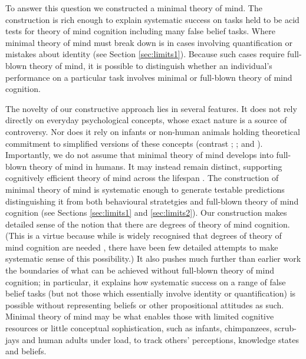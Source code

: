 \documentclass[12pt,\papersize]{extarticle}
\begin{document}
To answer this question we constructed a minimal theory of mind.  The construction is  rich enough to explain systematic success on tasks held to be acid tests for theory of mind cognition including many false belief tasks.  
Where minimal theory of mind must break down is in cases involving quantification or mistakes about identity (see Section \ref{sec:limits1}).  
Because such cases require full-blown theory of mind, it is possible to distinguish whether an individual’s performance on a particular task involves minimal or full-blown theory of mind cognition. 

The novelty of our constructive approach lies in several features.  It does not rely directly on everyday psychological concepts, whose exact nature is a source of controversy.
Nor does it rely on infants or non-human animals holding theoretical commitment to simplified versions of these concepts (contrast 
	\citealp{en_75};
	\citealp{en_81};
	\citealp{en_2372} and
	\citealp{en_1614}%
).
Importantly, we do not assume that minimal theory of mind develops into full-blown theory of mind in humans.  
It may instead remain distinct, supporting cognitively efficient theory of mind across the lifespan \citep[see][]{Samson:2010jm, en_2397}.  The construction of minimal theory of mind is systematic enough to generate testable predictions distinguishing it from both behavioural stratetgies and full-blown theory of mind cognition (see Sections \ref{sec:limits1} and \ref{sec:limits2}).  
Our construction makes detailed sense of the notion that there are degrees of theory of mind cognition.  
(This is a virtue because while is widely recognised that degrees of theory of mind cognition are needed \citep[e.g.][]{en_610, en_1415}, there have been few detailed attempts to make systematic sense of this possibility.)
It also pushes much further than earlier work the boundaries of what can be achieved without full-blown theory of mind cognition; in particular, it explains how systematic success on a range of false belief tasks (but not those which essentially involve identity or quantification) is possible without representing beliefs or other propositional attitudes as such. Minimal theory of mind may be what enables those with limited cognitive resources or little conceptual sophistication, such as infants, chimpanzees, scrub-jays and human adults under load,  to track others'  perceptions, knowledge states and beliefs. 








\small

\end{document}
